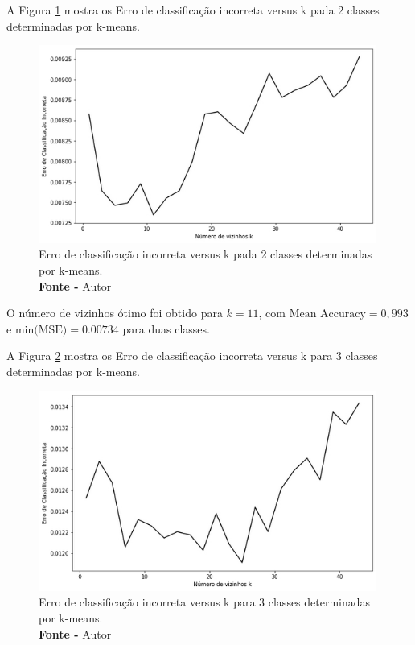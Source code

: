 A Figura \ref{fig: Erro de classificação incorreta versus k pada 2 classes determinadas por k-means} mostra os Erro de classificação incorreta versus k pada 2 classes determinadas por k-means.
\begin{figure}[H]
    \centering
    \includegraphics[width=0.99\textwidth]{Figuras/4. Resultados e Discussões/Exer4/Erro de classificação incorreta versus k pada 2 classes determinadas por k-means.jpg}
    \caption{Erro de classificação incorreta versus k pada 2 classes determinadas por k-means.\\ \textbf{Fonte -} Autor}
    \label{fig: Erro de classificação incorreta versus k pada 2 classes determinadas por k-means}
\end{figure}

O número de vizinhos ótimo foi obtido para $k = 11$, com $\text{Mean Accuracy} = 0,993$ e $\text{min(MSE)} = 0.00734$ para duas classes.

A Figura \ref{fig: Erro de classificação incorreta versus k para 3 classes determinadas por k-means} mostra os Erro de classificação incorreta versus k para 3 classes determinadas por k-means.
\begin{figure}[H]
    \centering
    \includegraphics[width=0.99\textwidth]{Figuras/4. Resultados e Discussões/Exer4/Erro de classificação incorreta versus k para 3 classes determinadas por k-means.jpg}
    \caption{Erro de classificação incorreta versus k para 3 classes determinadas por k-means.\\ \textbf{Fonte -} Autor}
    \label{fig: Erro de classificação incorreta versus k para 3 classes determinadas por k-means}
\end{figure}

